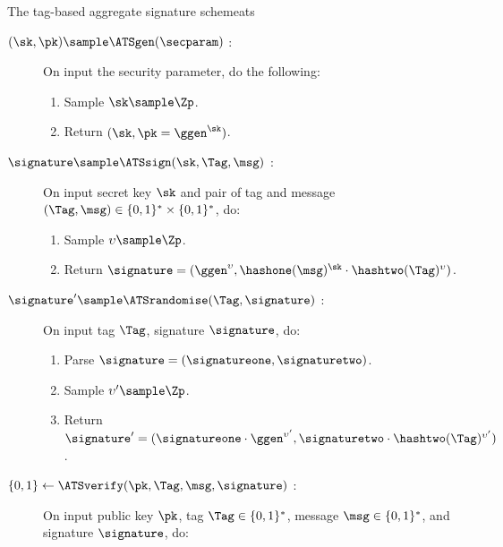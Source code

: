 \begin{protocolbox}{The tag-based aggregate signature scheme}{ats}

  \begin{description}

    \item[$(\sk, \pk) \sample \ATSgen(\secparam)$ :] On input the security
parameter, do the following:

      \begin{enumerate}

	\item Sample $\sk \sample \Zp$.

	\item Return $(\sk, \pk = \ggen^\sk)$.

      \end{enumerate}

    \item[$\signature \sample \ATSsign(\sk, \Tag, \msg)$ :] On input secret key
$\sk$ and pair of tag and message $(\Tag, \msg)\in \{0,1\}^*\times\{0,1\}^*$,
do:

      \begin{enumerate}

	\item Sample $\upsilon \sample \Zp$.

	\item Return $\signature = (\ggen^\upsilon, \hashone(\msg)^\sk \cdot
\hashtwo(\Tag)^\upsilon)$.

      \end{enumerate}

    \item[$\signature' \sample \ATSrandomise(\Tag, \signature) $ :] On input tag
$\Tag$, signature $\signature$, do:

      \begin{enumerate}

	\item Parse $\signature = (\signatureone, \signaturetwo)$.

	\item Sample $\upsilon' \sample \Zp$.

	\item Return $\signature' = (\signatureone \cdot  \ggen^{\upsilon'},
\signaturetwo \cdot \hashtwo(\Tag)^{\upsilon'})$.

      \end{enumerate}

    \item[$ \{0,1\} \leftarrow \ATSverify(\pk, \Tag, \msg, \signature) $ :] On
input public key $\pk$, tag $\Tag \in \{0,1\}^*$, message $\msg \in \{0,1\}^*$,
and signature $\signature$, do:


\end{description}
\end{protocolbox}
